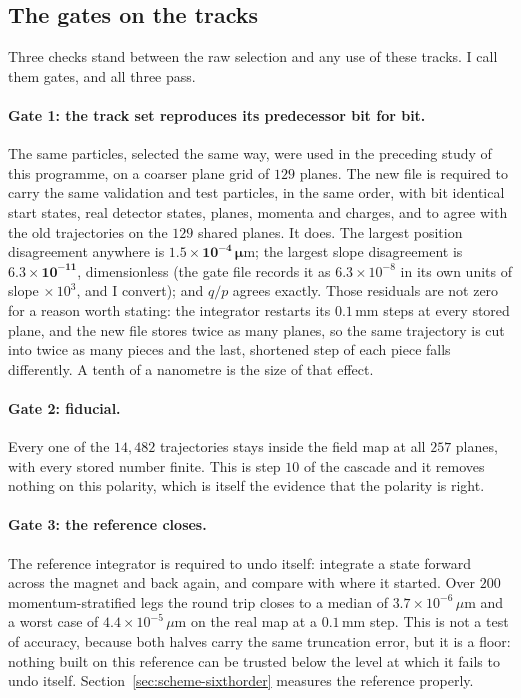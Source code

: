 \documentclass[11pt,a4paper]{article}
\newcommand{\um}{\ensuremath{\,\mu\mathrm{m}}}
\newcommand{\mm}{\ensuremath{\,\mathrm{mm}}}
\begin{document}
\subsection{The gates on the tracks}
\label{sec:data-gates}

Three checks stand between the raw selection and any use of these tracks. I
call them gates, and all three pass.

\paragraph{Gate 1: the track set reproduces its predecessor bit for bit.} The
same particles, selected the same way, were used in the preceding study of this
programme, on a coarser plane grid of $129$ planes. The new file is required to
carry the same validation and test particles, in the same order, with bit
identical start states, real detector states, planes, momenta and charges, and
to agree with the old trajectories on the $129$ shared planes. It does. The
largest position disagreement anywhere is
$\mathbf{1.5 \times 10^{-4}\,\mu\mathrm{m}}$; the largest slope disagreement is
$\mathbf{6.3 \times 10^{-11}}$, dimensionless (the gate file records it as
$6.3 \times 10^{-8}$ in its own units of slope $\times\,10^{3}$, and I convert);
and $q/p$ agrees exactly. Those residuals are not zero for a reason worth
stating: the integrator restarts its $0.1\mm$ steps at every stored plane, and
the new file stores twice as many planes, so the same trajectory is cut into
twice as many pieces and the last, shortened step of each piece falls
differently. A tenth of a nanometre is the size of that effect.

\paragraph{Gate 2: fiducial.} Every one of the $14{,}482$ trajectories stays
inside the field map at all $257$ planes, with every stored number finite. This
is step $10$ of the cascade and it removes nothing on this polarity, which is
itself the evidence that the polarity is right.

\paragraph{Gate 3: the reference closes.} The reference integrator is required
to undo itself: integrate a state forward across the magnet and back again, and
compare with where it started. Over $200$ momentum-stratified legs the round
trip closes to a median of $3.7 \times 10^{-6}\um$ and a worst case of
$4.4 \times 10^{-5}\um$ on the real map at a $0.1\mm$ step. This is not a test of
accuracy, because both halves carry the same truncation error, but it is a floor:
nothing built on this reference can be trusted below the level at which it fails
to undo itself. Section~\ref{sec:scheme-sixthorder} measures the reference
properly.
\end{document}

